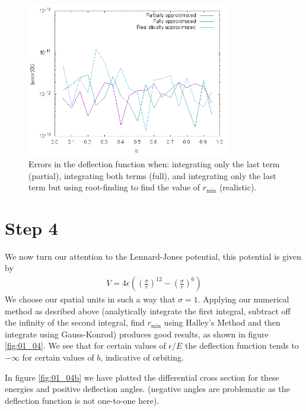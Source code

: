 \begin{figure}
  \centering
  \includegraphics[width=0.8\textwidth]{./plots/01_03}
  \caption{Errors in the deflection function when: integrating only the last term (partial), integrating both terms (full), and integrating only the last term but using root-finding to find the value of $r_\text{min}$ (realistic).}
  \label{fig:01_03}
\end{figure}

\section{Step 4}
We now turn our attention to the Lennard-Jones potential, this potential is given by
\begin{align}
  V = 4\epsilon\left(\left(\frac{\sigma}{r}\right)^{12}-\left(\frac{\sigma}{r}\right)^6\right)
\end{align}
We choose our spatial units in such a way that $\sigma = 1$.
Applying our numerical method as desribed above (analytically integrate the first integral, subtract off the infinity of the second integral, find $r_\text{min}$ using Halley's Method and then integrate using Gauss-Konrod)
produces good results, as shown in figure \ref{fig:01_04}. We see that for certain values of $\epsilon/E$ the deflection function tends to $-\infty$ for certain values of $b$, indicative of orbiting.
\par In figure \ref{fig:01_04b} we have plotted the differential cross section for these energies and positive deflection angles. (negative angles are problematic as the deflection function is not one-to-one here).

